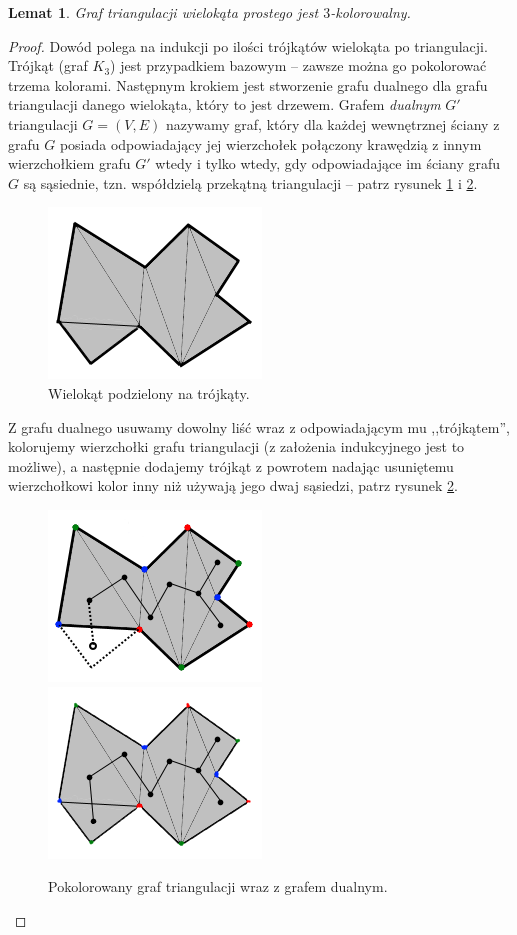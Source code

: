 \documentclass[brudnopis]{xmgr}
\newtheorem{Lemat}{Lemat}
\theoremstyle{definition}
\begin{document}
\begin{Lemat} \cite{fisk}
Graf triangulacji wielokąta prostego jest $3$-kolorowalny.
\end{Lemat}
\begin{proof}
	Dowód polega na indukcji po ilości trójkątów wielokąta po triangulacji. Trójkąt (graf $K_3$) jest przypadkiem bazowym -- zawsze można go pokolorować trzema kolorami. Następnym krokiem jest stworzenie grafu  dualnego dla grafu triangulacji danego wielokąta, który to jest drzewem. Grafem \emph{dualnym} $G'$ triangulacji $G=(V,E)$ nazywamy graf, który dla każdej wewnętrznej ściany z grafu $G$ posiada odpowiadający jej wierzchołek połączony krawędzią z innym wierzchołkiem grafu $G'$ wtedy i tylko wtedy, gdy odpowiadające im ściany grafu $G$ są sąsiednie, tzn. współdzielą przekątną triangulacji -- patrz rysunek \ref{fig:triangulacja_wielokata} i \ref{fig:graf_triangulacji}.
	\begin{figure}[ht!]
	  \centering
	  \includegraphics{rysunki/dual.png}
	    \caption{Wielokąt podzielony na trójkąty.}
      \label{fig:triangulacja_wielokata}
	\end{figure} 
	Z grafu dualnego usuwamy dowolny liść wraz z odpowiadającym mu ,,trójkątem'', kolorujemy wierzchołki grafu triangulacji (z założenia indukcyjnego jest to możliwe), a następnie dodajemy trójkąt z powrotem nadając usuniętemu wierzchołkowi kolor inny niż używają jego dwaj sąsiedzi, patrz rysunek \ref{fig:graf_triangulacji}.
  \begin{figure}[ht!]
    \centering
      \includegraphics{rysunki/dual_kolor.png} 
      \includegraphics{rysunki/dual_caly_kolor.png}
      \caption{Pokolorowany graf triangulacji wraz z grafem dualnym.}
      \label{fig:graf_triangulacji}
  \end{figure} 
\end{proof}
\end{document}
